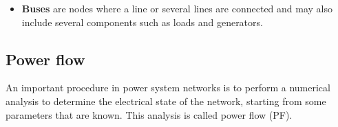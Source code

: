 \begin{itemize}
    \item \textbf{Buses} are nodes where a line or several lines are connected and may also include several components such as loads and generators.
\end{itemize}

\subsection{Power flow}
\label{powerflow}
An important procedure in power system networks is to perform a numerical analysis to determine the electrical state of the network, starting from some parameters that are known. This analysis is called power flow (\gls{PF}).\\

